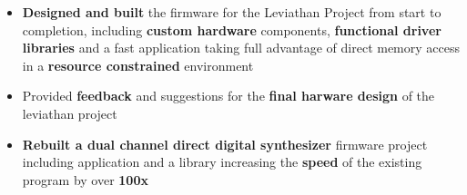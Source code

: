 


	\begin{fullwidth}
		\makecvheader
	\end{fullwidth}





    \begin{itemize}
        \item \textbf{Designed and built} the firmware for the Leviathan
            Project from start to completion, including \textbf{custom
            hardware} components, \textbf{functional driver libraries} and a
            fast application taking full advantage of direct memory access in a
            \textbf{resource constrained} environment
        \item Provided \textbf{feedback} and suggestions for the \textbf{final
            harware design} of the leviathan project
        \item \textbf{Rebuilt a dual channel direct digital synthesizer}
            firmware project including application and a library increasing the
            \textbf{speed} of the existing program by over \textbf{100x}
            \smallskip

    \end{itemize}

